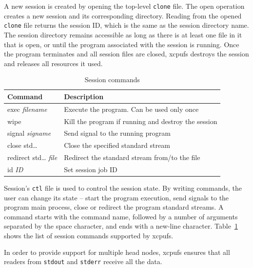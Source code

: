 \documentclass[10pt,conference,letterpaper]{IEEEtran}
\begin{document}
A new session is created by opening the top-level \texttt{clone} file. The
open operation creates a new session and its corresponding directory.
Reading from the opened \texttt{clone} file returns the session ID, which is
the same as the session directory name. The session directory remains
accessible as long as there is at least one file in it that is open, or
until the program associated with the session is running. Once the program
terminates and all session files are closed, xcpufs destroys the session and
releases all resources it used.

\begin{table}[ht]
\begin{center}
\begin{tabular}{lp{1.9in}}
    Command & Description\\
    \hline
    exec \textsl{filename} & Execute the program. Can be used only once\\
    wipe & Kill the program if running and destroy the session\\
    signal \textsl{signame} & Send signal to the running program\\
    close std{\ldots} & Close the specified standard stream\\
    redirect std{\ldots} \textsl{file} & Redirect the standard stream from/to the file\\
    id \textsl{ID} & Set session job ID\\
\end{tabular}
\caption{Session commands}
\label{tbl:xcpu2-sctl}
\end{center}
\end{table}

Session's \texttt{ctl} file is used to control the session state. By writing
commands, the user can change its state -- start the program execution, send
signals to the program main process, close or redirect the program standard
streams. A command starts with the command name, followed by a number of
arguments separated by the space character, and ends with a new-line
character. Table~\ref{tbl:xcpu2-sctl} shows the list of session commands
supported by xcpufs.

In order to provide support for multiple head nodes, xcpufs ensures that all
readers from \texttt{stdout} and \texttt{stderr} receive all the data. 
\end{document}
